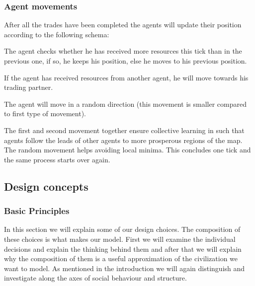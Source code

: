 \documentclass{JASSS}
\begin{document}
\subsubsection{Agent movements}
		After all the trades have been completed the agents will update their position according to the following schema:
\begin{enumerate*}
	\item
		The agent checks whether he has received more resources this tick than in the previous one, if so, he keeps his position, else he moves to his previous position.

	\item
		If the agent has received resources from another agent, he will move towards his trading partner.

	\item
		The agent will move in a random direction (this movement is smaller compared to first type of movement). 
\end{enumerate*}
The first and second movement together ensure collective learning in such that agents follow the leads of other agents to more prosperous regions of the map. The random movement helps avoiding local minima. This concludes one tick and the same process starts over again.


\subsection{Design concepts}

\subsubsection{Basic Principles}
	In this section we will explain some of our design choices. The composition of these choices is what makes our model. First we will examine the individual decisions and explain the thinking behind them and after that we will explain why the composition of them is a useful approximation of the civilization we want to model. As mentioned in the introduction we will again distinguish and investigate along the axes of social behaviour and structure.
	
\end{document}
